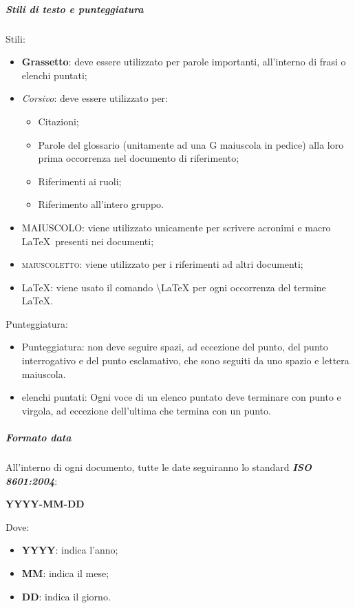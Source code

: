 				\subparagraph{Stili di testo e punteggiatura}
				Stili:
				\begin{itemize}
					\item \textbf{Grassetto}: deve essere utilizzato per parole importanti, all’interno di frasi o elenchi puntati;
					\item \textit{Corsivo}: deve essere utilizzato per:
					\begin{itemize}
						\item Citazioni;
						\item Parole del glossario (unitamente ad una G maiuscola in pedice) alla loro prima occorrenza nel documento di riferimento;
						\item Riferimenti ai ruoli;
						\item Riferimento all'intero gruppo.
					\end{itemize}
					\item MAIUSCOLO: viene utilizzato unicamente per scrivere acronimi e macro \LaTeX\ presenti nei documenti;
					\item \textsc{maiuscoletto}: viene utilizzato per i riferimenti ad altri documenti;
					\item \LaTeX: viene usato il comando \textbackslash{LaTeX} per ogni occorrenza del termine \LaTeX.
					\end{itemize}
				Punteggiatura:
				\begin{itemize}
					\item Punteggiatura: non deve seguire spazi, ad eccezione del punto, del punto interrogativo e del punto esclamativo, che sono seguiti da uno spazio e lettera maiuscola.
					\item elenchi puntati: Ogni voce di un elenco puntato deve terminare con punto e virgola, ad eccezione dell'ultima che termina con un punto. 
					
				\end{itemize}
	
				\subparagraph{Formato data}
				All'interno di ogni documento, tutte le date seguiranno lo standard \textit{\textbf{ISO 8601:2004}}:
				\begin{center}
					\textbf{YYYY-MM-DD}
				\end{center}
				Dove:
				\begin{itemize}
					\item \textbf{YYYY}: indica l'anno;
					\item \textbf{MM}: indica il mese;
					\item \textbf{DD}: indica il giorno.
				\end{itemize}
		

